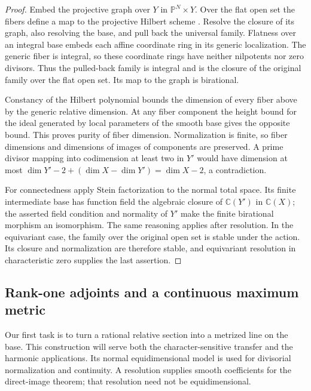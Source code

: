 \begin{proof}
Embed the projective graph over $Y$ in $\mathbb P^N\times Y$.
Over the flat open set the fibers define a map to the projective
Hilbert scheme \cite[Theorem~3.2 and the Hilbert-scheme specialization
after Proposition~3.8]{Grothendieck1961Hilbert}.
Resolve the closure of its graph, also resolving the base, and pull back the
universal family.  Flatness over an integral base embeds each affine
coordinate ring in its generic localization.  The generic fiber is
integral, so these coordinate rings have neither nilpotents nor zero
divisors.  Thus the pulled-back family is integral and is the closure of
the original family over the flat open set.  Its map to the graph is
birational.

Constancy of the Hilbert polynomial bounds the dimension of every fiber
above by the generic relative dimension.  At any fiber component the
height bound for the ideal generated by local parameters of the smooth
base gives the opposite bound.  This proves purity of fiber dimension.
Normalization is finite, so fiber dimensions and dimensions of images of
components are preserved.  A prime divisor mapping into codimension at
least two in $Y'$ would have dimension at most
$\dim Y'-2+(\dim X-\dim Y')=\dim X-2$, a contradiction.

For connectedness apply Stein factorization to the normal total space.
Its finite intermediate base has function field the algebraic closure
of $\mathbb C(Y')$ in $\mathbb C(X)$; the asserted field condition and
normality of $Y'$ make the finite birational morphism an isomorphism.
The same reasoning applies after resolution.  In the equivariant case,
the family over the original open set is stable under the action.
Its closure and normalization are therefore stable, and equivariant
resolution in characteristic zero supplies the last assertion.
\end{proof}


\subsection{Rank-one adjoints and a continuous maximum metric}\label{har:sec:maximum}

Our first task is to turn a rational relative section into a metrized line on the base. This construction will serve both the character-sensitive transfer and the harmonic applications.
Its normal equidimensional model is used for divisorial normalization
and continuity. A resolution supplies smooth coefficients for the
direct-image theorem; that resolution need not be equidimensional.

